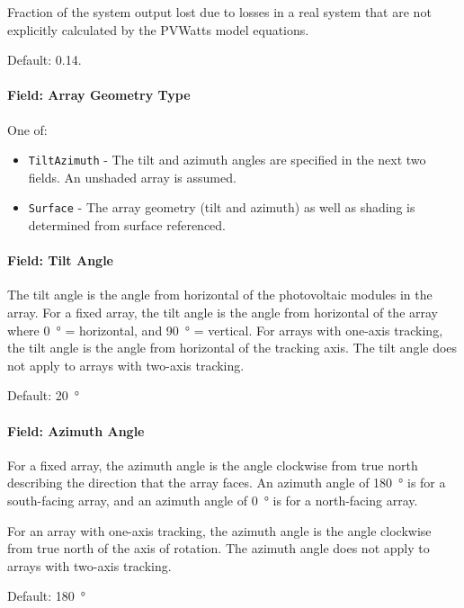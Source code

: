 Fraction of the system output lost due to losses in a real system that
are not explicitly calculated by the PVWatts model equations.

Default: 0.14.

\paragraph{Field: Array Geometry
Type}\label{field-array-geometry-type}

One of:

\begin{itemize}
\tightlist
\item
  \texttt{TiltAzimuth} - The tilt and azimuth angles are specified in
  the next two fields. An unshaded array is assumed.
\item
  \texttt{Surface} - The array geometry (tilt and azimuth) as well as
  shading is determined from surface referenced.
\end{itemize}

\paragraph{Field: Tilt Angle}\label{field-tilt-angle}

The tilt angle is the angle from horizontal of the photovoltaic modules
in the array. For a fixed array, the tilt angle is the angle from
horizontal of the array where \SI{0}{\degree} = horizontal, and \SI{90}{\degree} = vertical. For
arrays with one-axis tracking, the tilt angle is the angle from
horizontal of the tracking axis. The tilt angle does not apply to arrays
with two-axis tracking.

Default: \SI{20}{\degree}

\paragraph{Field: Azimuth Angle}\label{field-azimuth-angle}

For a fixed array, the azimuth angle is the angle clockwise from true
north describing the direction that the array faces. An azimuth angle of
\SI{180}{\degree} is for a south-facing array, and an azimuth angle of \SI{0}{\degree}
is for a north-facing array.

For an array with one-axis tracking, the azimuth angle is the angle
clockwise from true north of the axis of rotation. The azimuth angle
does not apply to arrays with two-axis tracking.

Default: \SI{180}{\degree}


